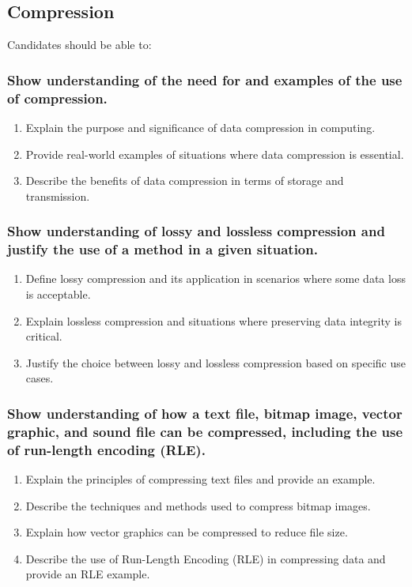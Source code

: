 \documentclass[a4paper]{article}
\begin{document}
\subsection{Compression}
Candidates should be able to:
\subsubsection{Show understanding of the need for and examples of the use of compression.}
\begin{enumerate}
  \item Explain the purpose and significance of data compression in computing.
  \item Provide real-world examples of situations where data compression is essential.
  \item Describe the benefits of data compression in terms of storage and transmission.
\end{enumerate}

\subsubsection{Show understanding of lossy and lossless compression and justify the use of a method in a given situation.}
\begin{enumerate}
  \item Define lossy compression and its application in scenarios where some data loss is acceptable.
  \item Explain lossless compression and situations where preserving data integrity is critical.
  \item Justify the choice between lossy and lossless compression based on specific use cases.
\end{enumerate}

\subsubsection{Show understanding of how a text file, bitmap image, vector graphic, and sound file can be compressed, including the use of run-length encoding (RLE).}
\begin{enumerate}
  \item Explain the principles of compressing text files and provide an example.
  \item Describe the techniques and methods used to compress bitmap images.
  \item Explain how vector graphics can be compressed to reduce file size.
  \item Describe the use of Run-Length Encoding (RLE) in compressing data and provide an RLE example.
\end{enumerate}
\end{document}
